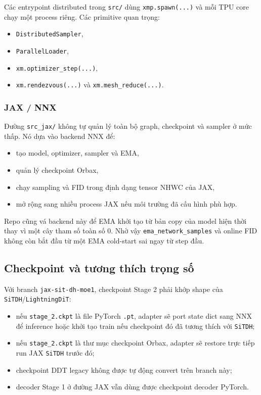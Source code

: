 Các entrypoint distributed trong \texttt{src/} dùng \texttt{xmp.spawn(...)} và
mỗi TPU core chạy một process riêng. Các primitive quan trọng:

\begin{itemize}[leftmargin=1.5em]
  \item \texttt{DistributedSampler},
  \item \texttt{ParallelLoader},
  \item \texttt{xm.optimizer\_step(...)},
  \item \texttt{xm.rendezvous(...)} và \texttt{xm.mesh\_reduce(...)}.
\end{itemize}

\subsubsection{JAX / NNX}

Đường \texttt{src\_jax/} không tự quản lý toàn bộ graph, checkpoint và sampler ở
mức thấp. Nó dựa vào backend NNX để:

\begin{itemize}[leftmargin=1.5em]
  \item tạo model, optimizer, sampler và EMA,
  \item quản lý checkpoint Orbax,
  \item chạy sampling và FID trong định dạng tensor NHWC của JAX,
  \item mở rộng sang nhiều process JAX nếu môi trường đã cấu hình phù hợp.
\end{itemize}

Repo cũng vá backend này để EMA khởi tạo từ bản copy của model hiện thời thay vì
một cây tham số toàn số 0. Nhờ vậy \texttt{ema\_network\_samples} và online FID
không còn bắt đầu từ một EMA cold-start sai ngay từ step đầu.

\subsection{Checkpoint và tương thích trọng số}

Với branch \texttt{jax-sit-dh-moe1}, checkpoint Stage 2 phải khớp shape của
\texttt{SiTDH}/\texttt{LightningDiT}:

\begin{itemize}[leftmargin=1.5em]
  \item nếu \texttt{stage\_2.ckpt} là file PyTorch \texttt{.pt}, adapter sẽ
  port state dict sang NNX để inference hoặc khởi tạo train nếu checkpoint đó
  đã tương thích với \texttt{SiTDH};
  \item nếu \texttt{stage\_2.ckpt} là thư mục checkpoint Orbax, adapter sẽ
  restore trực tiếp run JAX \texttt{SiTDH} trước đó;
  \item checkpoint DDT legacy không được tự động convert trên branch này;
  \item decoder Stage 1 ở đường JAX vẫn dùng được checkpoint decoder PyTorch.
\end{itemize}

